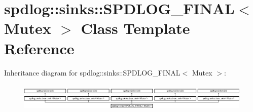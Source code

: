 \hypertarget{classspdlog_1_1sinks_1_1SPDLOG__FINAL}{}\section{spdlog\+:\+:sinks\+:\+:S\+P\+D\+L\+O\+G\+\_\+\+F\+I\+N\+AL$<$ Mutex $>$ Class Template Reference}
\label{classspdlog_1_1sinks_1_1SPDLOG__FINAL}
Inheritance diagram for spdlog\+:\+:sinks\+:\+:S\+P\+D\+L\+O\+G\+\_\+\+F\+I\+N\+AL$<$ Mutex $>$\+:\begin{figure}[H]
\begin{center}
\leavevmode
\includegraphics[height=1.349398cm]{classspdlog_1_1sinks_1_1SPDLOG__FINAL}
\end{center}
\end{figure}
